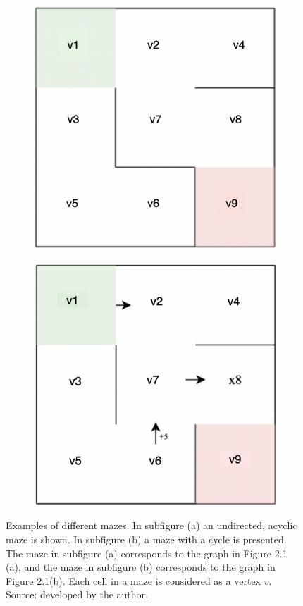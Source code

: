  \begin{figure}[!h]
	\centering
	\begin{subfigure}{.45\textwidth}
	  \centering
	  \includegraphics[width=.6\linewidth]{undirectedmaze}
	  \caption{}
	  \label{fig:sub1}
	\end{subfigure}
	\begin{subfigure}{.45\textwidth}
	  \centering
	  \includegraphics[width=.6\linewidth]{cyclicmaze}
	  \caption{}
	  \label{fig:sub2}
	\end{subfigure}
	\caption{Examples of different mazes. In subfigure (a) an undirected, acyclic maze is shown. In subfigure (b) a maze with a cycle is presented. The maze in subfigure (a) corresponds to the graph in Figure 2.1 (a), and the maze in subfigure (b) corresponds to the graph in Figure 2.1(b). Each cell in a maze is considered as a vertex $v$.\\Source: developed by the author.}
	\label{fig:test}
	\end{figure}	

